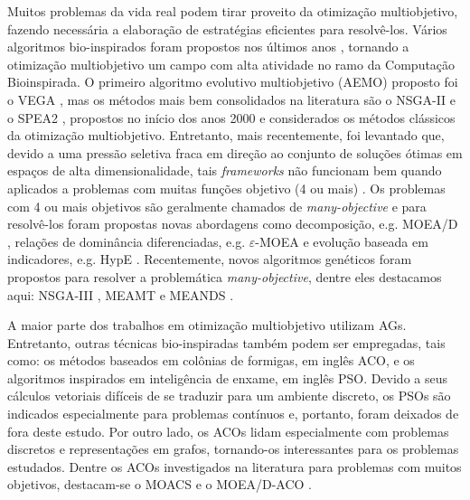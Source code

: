 Muitos problemas da vida real podem tirar proveito da otimização multiobjetivo, fazendo necessária a elaboração de estratégias eficientes para resolvê-los. Vários algoritmos bio-inspirados foram propostos nos últimos anos \cite{Deb2002,Zitzler2002,Deb2014}, tornando a otimização multiobjetivo um campo com alta atividade no ramo da Computação Bioinspirada. O primeiro algoritmo evolutivo multiobjetivo (AEMO) proposto foi o \ac{VEGA} \cite{Schaffer1985}, mas os métodos mais bem consolidados na literatura são o NSGA-II \cite{Deb2002} e o SPEA2 \cite{Zitzler2002}, propostos no início dos anos 2000 e considerados os métodos clássicos da otimização multiobjetivo. Entretanto, mais recentemente, foi levantado que, devido a uma pressão seletiva fraca em direção ao conjunto de soluções ótimas em espaços de alta dimensionalidade, tais \textit{frameworks} não funcionam bem quando aplicados a problemas com muitas funções objetivo (4 ou mais) \cite{Franca2017}. Os problemas com 4 ou mais objetivos são geralmente chamados de \textit{many-objective} e para resolvê-los foram propostas novas abordagens como decomposição, e.g. MOEA/D \cite{Zhang2007}, relações de dominância diferenciadas, e.g. $\varepsilon$-MOEA \cite{Aguirre2009} e evolução baseada em indicadores, e.g. HypE \cite{Bader2011}. Recentemente, novos algoritmos genéticos foram propostos para resolver a problemática \textit{many-objective}, dentre eles destacamos aqui: NSGA-III \cite{Deb2014}, MEAMT \cite{Brasil2013} e MEANDS \cite{Lafeta2017}.

A maior parte dos trabalhos em otimização multiobjetivo utilizam \acp{AG}. Entretanto, outras técnicas bio-inspiradas também podem ser empregadas, tais como: os métodos baseados em colônias de formigas, em inglês \ac{ACO}, e os algoritmos inspirados em inteligência de enxame, em inglês \ac{PSO}. Devido a seus cálculos vetoriais difíceis de se traduzir para um ambiente discreto, os \acp{PSO} são indicados especialmente para problemas contínuos e, portanto, foram deixados de fora deste estudo. Por outro lado, os \acp{ACO} lidam especialmente com problemas discretos e representações em grafos, tornando-os interessantes para os problemas estudados. Dentre os ACOs investigados na literatura para problemas com muitos objetivos, destacam-se o MOACS \cite{Baran2003} e o MOEA/D-ACO \cite{Ke2013}.

